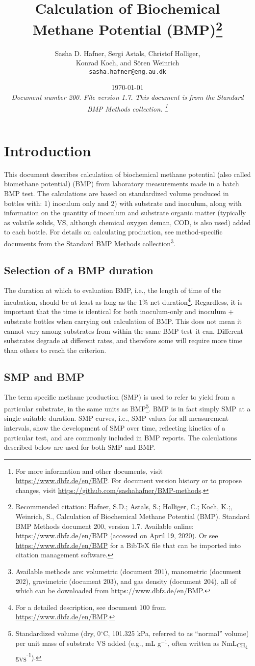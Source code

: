 \documentclass[]{article}
\title {Calculation of Biochemical Methane Potential (BMP)\footnote{
  Recommended citation: 
Hafner, S.D.; Astals, S.; Holliger, C.; Koch, K.;, Weinrich, S., Calculation of Biochemical Methane Potential (BMP). Standard BMP Methods document 200, version 1.7. Available online: https://www.dbfz.de/en/BMP (accessed on April 19, 2020).
\newline
  Or see \url{https://www.dbfz.de/en/BMP} for a BibTeX file that can be imported into citation management software.
}}
\author{Sasha D. Hafner, Sergi Astals, Christof Holliger, \\ Konrad Koch, and S{\"o}ren Weinrich\\
\texttt{sasha.hafner@eng.au.dk}
}
\date{\today \\
\bigskip
\textit{
  Document number 200.
  File version 1.7. 
  This document is from the Standard BMP Methods collection.
    \footnote{For more information and other documents, visit \url{https://www.dbfz.de/en/BMP}. 
    For document version history or to propose changes, visit \url{https://github.com/sashahafner/BMP-methods}.}
}
}
\begin{document}
\maketitle

\section{Introduction}
This document describes calculation of biochemical methane potential (also called biomethane potential) (BMP) from laboratory measurements made in a batch BMP test.
The calculations are based on standardized  volume produced in bottles with: 1) inoculum only and 2) with substrate and inoculum, along with information on the quantity of inoculum and substrate organic matter (typically as volatile solids, VS, although chemical oxygen deman, COD, is also used) added to each bottle.
For details on calculating  production, see method-specific documents from the Standard BMP Methods collection\footnote{
  Available methods are: volumetric (document 201), manometric (document 202), gravimetric (document 203), and gas density (document 204), all of which can be downloaded from \url{https://www.dbfz.de/en/BMP}.
}.

\subsection{Selection of a BMP duration}
The duration at which to evaluation BMP, i.e., the length of time of the incubation, should be at least as long as the 1\% net duration\footnote{
  For a detailed description, see document 100 from \url{https://www.dbfz.de/en/BMP}.
}.
Regardless, it is important that the time is identical for both inoculum-only and inoculum + substrate bottles when carrying out calculation of BMP.
This does not mean it cannot vary among substrates from within the same BMP test--it can.
Different substrates degrade at different rates, and therefore some will require more time than others to reach the criterion.

\subsection{SMP and BMP}
The term specific methane production (SMP) is used to refer to  yield from a particular substrate, in the same units as BMP\footnote{
  Standardized  volume (dry, 0$^\circ$C, 101.325 kPa, referred to as ``normal'' volume) per unit mass of substrate VS added (e.g., mL g$^{-1}$, often written as NmL\textsubscript{CH\textsubscript{4}} g\textsubscript{VS}\textsuperscript{-1}).
}.
BMP is in fact simply SMP at a single suitable duration.
SMP curves, i.e., SMP values for all measurement intervals, show the development of SMP over time, reflecting kinetics of a particular test, and are commonly included in BMP reports.
The calculations described below are used for both SMP and BMP.
\end{document}

